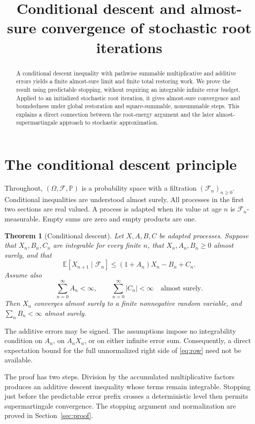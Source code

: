 \documentclass[11pt]{article}
\title{Conditional descent and almost-sure convergence of stochastic root iterations}
\author{}\date{}
\newtheorem{theorem}{Theorem}[section]
\newcommand{\E}{\mathbb E}
\newcommand{\F}{\mathcal F}
\begin{document}
\maketitle
\begin{abstract}
A conditional descent inequality with pathwise summable multiplicative and
additive errors yields a finite almost-sure limit and finite total restoring
work. We prove the result using predictable stopping, without requiring an
integrable infinite error budget. Applied to an initialized stochastic root
iteration, it gives almost-sure convergence and boundedness under global
restoration and square-summable, nonsummable steps. This explains a direct
connection between the root-energy argument and the later
almost-supermartingale approach to stochastic approximation.
\end{abstract}

\section{The conditional descent principle}
Throughout, $(\Omega,\F,\mathbb P)$ is a probability space with a filtration
$(\F_n)_{n\ge0}$. Conditional inequalities are understood almost surely.
All processes in the first two sections are real valued. A process is adapted
when its value at age $n$ is $\F_n$-measurable. Empty sums are zero and empty
products are one.

\begin{theorem}[Conditional descent]\label{thm:descent}
Let $X,A,B,C$ be adapted processes. Suppose that $X_n,B_n,C_n$ are integrable
for every finite $n$, that $X_n,A_n,B_n\ge0$ almost surely, and that
\begin{equation}\label{eq:row}
 \E[X_{n+1}\mid\F_n]\le(1+A_n)X_n-B_n+C_n.
\end{equation}
Assume also
\[
 \sum_{n=0}^\infty A_n<\infty,
 \qquad \sum_{n=0}^\infty |C_n|<\infty
 \quad\text{almost surely}.
\]
Then $X_n$ converges almost surely to a finite nonnegative random variable,
and $\sum_n B_n<\infty$ almost surely.
\end{theorem}
The additive errors may be signed. The assumptions impose no integrability
condition on $A_n$, on $A_nX_n$, or on either infinite error sum.
Consequently, a direct expectation bound for the full unnormalized right
side of \eqref{eq:row} need not be available.

The proof has two steps. Division by the accumulated multiplicative factors
produces an additive descent inequality whose terms remain integrable.
Stopping just before the predictable error prefix crosses a deterministic
level then permits supermartingale convergence. The stopping argument and
normalization are proved in Section~\ref{sec:proof}.
\end{document}
